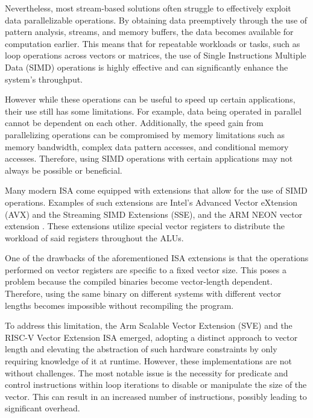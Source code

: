 %    
%    
%    
%   


Nevertheless, most stream-based solutions often struggle to effectively exploit data parallelizable operations. By obtaining data preemptively through the use of pattern analysis, streams, and memory buffers, the data becomes available for computation earlier. This means that for repeatable workloads or tasks, such as loop operations across vectors or matrices, the use of Single Instructions Multiple Data (\acrshort{SIMD}) operations is highly effective and can significantly enhance the system's throughput.

However while these operations can be useful to speed up certain applications, their use still has some limitations. For example, data being operated in parallel cannot be dependent on each other. Additionally, the speed gain from parallelizing operations can be compromised by memory limitations such as memory bandwidth, complex data pattern accesses, and conditional memory accesses. Therefore, using SIMD operations with certain applications may not always be possible or beneficial.

Many modern \acrfull{ISA} come equipped with extensions that allow for the use of \acrfull{SIMD} operations. Examples of such extensions are Intel's Advanced Vector eXtension (AVX) and the Streaming SIMD Extensions (SSE), and the ARM NEON vector extension \cite{arm-neon}. These extensions utilize special vector registers to distribute the workload of said registers throughout the \acrshort{ALUs}.

One of the drawbacks of the aforementioned \acrshort{ISA} extensions is that the operations performed on vector registers are specific to a fixed vector size. This poses a problem because the compiled binaries become vector-length dependent. Therefore, using the same binary on different systems with different vector lengths becomes impossible without recompiling the program. 

To address this limitation, the Arm Scalable Vector Extension (SVE) and the RISC-V Vector Extension ISA emerged, adopting a distinct approach to vector length and elevating the abstraction of such hardware constraints by only requiring knowledge of it at runtime. However, these implementations are not without challenges. The most notable issue is the necessity for predicate and control instructions within loop iterations to disable or manipulate the size of the vector. This can result in an increased number of instructions, possibly leading to significant overhead.


